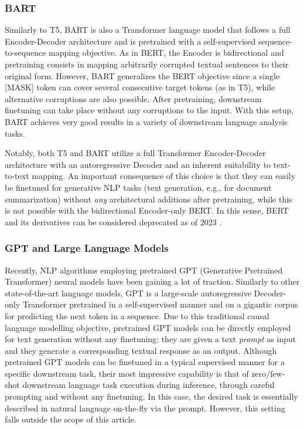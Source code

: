 \documentclass[preprint,review,10pt]{elsarticle}
\begin{document}
	\subsubsection{BART}
	Similarly to T5, BART \cite{bart} is also a Transformer language model that follows a full Encoder-Decoder architecture and is pretrained with a self-supervised sequence-to-sequence mapping objective. As in BERT, the Encoder is bidirectional and pretraining consists in mapping arbitrarily corrupted textual sentences to their original form. However, BART generalizes the BERT objective since a single [MASK] token can cover several consecutive target tokens (as in T5), while alternative corruptions are also possible. After pretraining, downstream finetuning can take place without any corruptions to the input. With this setup, BART achieves very good results in a variety of downstream language analysis tasks.
	
	Notably, both T5 and BART utilize a full Transformer Encoder-Decoder architecture with an autoregressive Decoder and an inherent suitability to text-to-text mapping. An important consequence of this choice is that they can easily be finetuned for generative NLP tasks (text generation, e.g., for document summarization) without \textit{any} architectural additions after pretraining, while this is not possible with the bidirectional Encoder-only BERT. In this sense, BERT and its derivatives can be considered deprecated as of 2023 \cite{tay2022ul2}.
	
	\subsubsection{GPT and Large Language Models}
	Recently, NLP algorithms employing pretrained GPT (Generative Pretrained Transformer) \cite{GPT} neural models have been gaining a lot of traction. Similarly to other state-of-the-art language models, GPT is a large-scale autoregressive Decoder-only Transformer pretrained in a self-supervised manner and on a gigantic corpus for predicting the next token in a sequence. Due to this traditional causal language modelling objective, pretrained GPT models can be directly employed for text generation without any finetuning: they are given a text \textit{prompt} as input and they generate a corresponding textual response as an output. Although pretrained GPT models can be finetuned in a typical supervised manner for a specific downstream task, their most impressive capability is that of zero/few-shot downstream language task execution during inference, through careful prompting and without any finetuning. In this case, the desired task is essentially described in natural language on-the-fly via the prompt. However, this setting falls outside the scope of this article.
	
\end{document}
